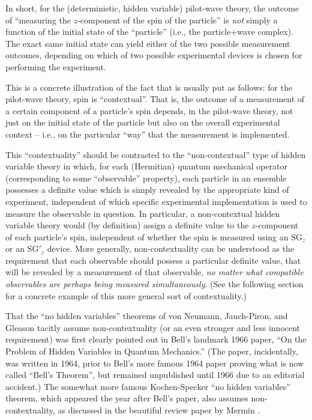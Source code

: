 \documentclass[aps,prc,onecolumn,letterpaper,floatfix,12pt]{revtex4}
\begin{document}
In short, for the (deterministic, hidden variable) pilot-wave theory, 
the outcome of ``measuring the $z$-component of the spin of the
particle'' is \emph{not} simply a function of the initial state of the
``particle'' (i.e., the particle+wave complex).  The exact same
initial state can yield either of the two possible
measurement outcomes, depending on which of two possible experimental
devices is chosen for performing the experiment.  

This is a concrete illustration of the fact that is usually put as
follows:  for the pilot-wave theory, spin is ``contextual''.  That is,
the outcome of a measurement of a certain component of a particle's
spin depends, in the pilot-wave theory, not just on the initial state
of the particle but also on the overall experimental context -- i.e.,
on the particular ``way'' that the measurement is implemented.  

This ``contextuality'' should be contrasted to the ``non-contextual''
type of hidden variable theory in which, for each (Hermitian) 
quantum mechanical operator (corresponding to some ``observable''
property), each particle in an ensemble possesses a definite value
which is simply revealed by the appropriate kind of experiment,
independent of which specific experimental implementation is used to
measure the observable in question.  In particular,  a
non-contextual hidden variable theory would (by definition) assign a
definite value to the $z$-component of each particle's spin,
independent of whether the spin is measured using an $\text{SG}_z$ or
an $\text{SG}'_z$ device.  More generally, non-contextuality can be
understood as the requirement that each observable should possess a
particular definite value, that will be revealed by a measurement of
that observable, \emph{no matter what compatible observables are
  perhaps being measured simultaneously}.  (See the following section
for a concrete example of this more general sort of contextuality.)

That the ``no hidden variables'' theorems of von Neumann, Jauch-Piron,
and Gleason tacitly assume non-contextuality (or an even stronger and
less innocent requirement) was first clearly pointed out in Bell's
landmark 1966 paper, ``On the Problem of Hidden Variables in Quantum
Mechanics.''  \cite{bell66}  (The paper, incidentally, was written in
1964, prior to Bell's more famous 1964 paper proving what is now
called ``Bell's Theorem'', but remained unpublished until 1966 
due to an editorial
accident.)  The somewhat more famous Kochen-Specker ``no hidden
variables'' theorem, which appeared the year after Bell's paper, also
assumes non-contextuality, as discussed in the beautiful review
paper by Mermin \cite{ks, mermin}.  
\end{document}
